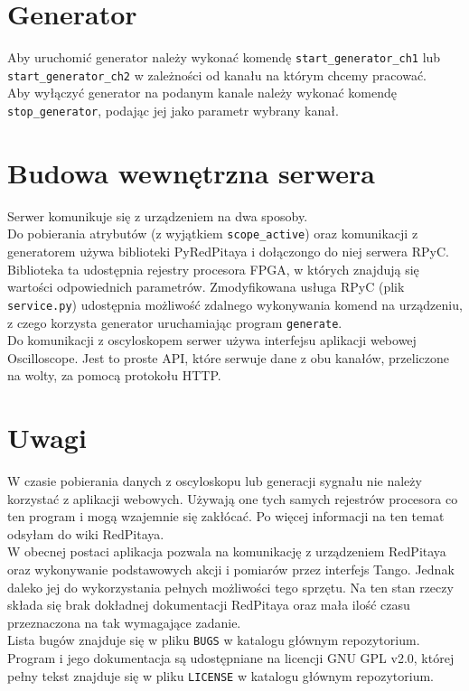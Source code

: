 \documentclass[12pt,a4paper]{article}
\begin{document}
	\section{Generator}
	Aby uruchomić generator należy wykonać komendę \texttt{start\_generator\_ch1} lub \texttt{start\_generator\_ch2} w zależności od kanału na którym chcemy pracować.\\
	Aby wyłączyć generator na podanym kanale należy wykonać komendę \texttt{stop\_generator}, podając jej jako parametr wybrany kanał.

	\section{Budowa wewnętrzna serwera}
	Serwer komunikuje się z urządzeniem na dwa sposoby.\\
	Do pobierania atrybutów (z wyjątkiem \texttt{scope\_active}) oraz komunikacji z generatorem używa biblioteki PyRedPitaya i dołączongo do niej serwera RPyC.
	Biblioteka ta udostępnia rejestry procesora FPGA, w których znajdują się wartości odpowiednich parametrów.
	Zmodyfikowana usługa RPyC (plik \texttt{service.py}) udostępnia możliwość zdalnego wykonywania komend na urządzeniu, z czego korzysta generator uruchamiając program \texttt{generate}.\\
	Do komunikacji z oscyloskopem serwer używa interfejsu aplikacji webowej Oscilloscope. Jest to proste API, które serwuje dane z obu kanałów, przeliczone na wolty, za pomocą protokołu HTTP.

	\section{Uwagi}
	W czasie pobierania danych z oscyloskopu lub generacji sygnału nie należy korzystać z aplikacji webowych. Używają one tych samych rejestrów procesora co ten program i mogą wzajemnie się zakłócać. Po więcej informacji na ten temat odsyłam do wiki RedPitaya.\\
	W obecnej postaci aplikacja pozwala na komunikację z urządzeniem RedPitaya oraz wykonywanie podstawowych akcji i pomiarów przez interfejs Tango.
	Jednak daleko jej do wykorzystania pełnych możliwości tego sprzętu. Na ten stan rzeczy składa się brak dokładnej dokumentacji RedPitaya oraz mała ilość czasu przeznaczona na tak wymagające zadanie.\\
	Lista bugów znajduje się w pliku \texttt{BUGS} w katalogu głównym repozytorium.\\
	Program i jego dokumentacja są udostępniane na licencji GNU GPL v2.0, której pełny tekst znajduje się w pliku \texttt{LICENSE} w katalogu głównym repozytorium. 
\end{document}
